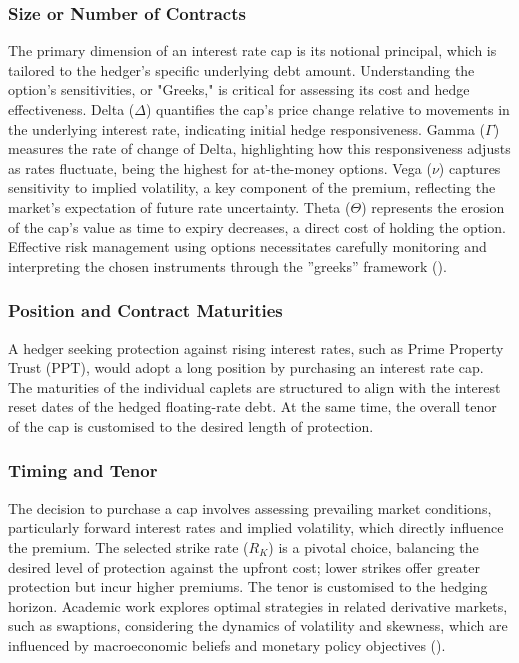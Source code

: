 \documentclass[11pt, a4paper, british]{article}
\begin{document}
\subsubsection{Size or Number of Contracts}
The primary dimension of an interest rate cap is its notional principal, which is tailored to the hedger's specific underlying debt amount. Understanding the option's sensitivities, or "Greeks," is critical for assessing its cost and hedge effectiveness. Delta ($\Delta$) quantifies the cap's price change relative to movements in the underlying interest rate, indicating initial hedge responsiveness. Gamma ($\Gamma$) measures the rate of change of Delta, highlighting how this responsiveness adjusts as rates fluctuate, being the highest for at-the-money options. Vega ($\nu$) captures sensitivity to implied volatility, a key component of the premium, reflecting the market's expectation of future rate uncertainty. Theta ($\Theta$) represents the erosion of the cap's value as time to expiry decreases, a direct cost of holding the option. Effective risk management using options necessitates carefully monitoring and interpreting the chosen instruments through the ''greeks'' framework (\cite{ws}).

\subsubsection{Position and Contract Maturities}
A hedger seeking protection against rising interest rates, such as Prime Property Trust (PPT), would adopt a long position by purchasing an interest rate cap. The maturities of the individual caplets are structured to align with the interest reset dates of the hedged floating-rate debt. At the same time, the overall tenor of the cap is customised to the desired length of protection.

\subsubsection{Timing and Tenor}
The decision to purchase a cap involves assessing prevailing market conditions, particularly forward interest rates and implied volatility, which directly influence the premium. The selected strike rate ($R_K$) is a pivotal choice, balancing the desired level of protection against the upfront cost; lower strikes offer greater protection but incur higher premiums. The tenor is customised to the hedging horizon. Academic work explores optimal strategies in related derivative markets, such as swaptions, considering the dynamics of volatility and skewness, which are influenced by macroeconomic beliefs and monetary policy objectives (\cite{ts}).
\end{document}
